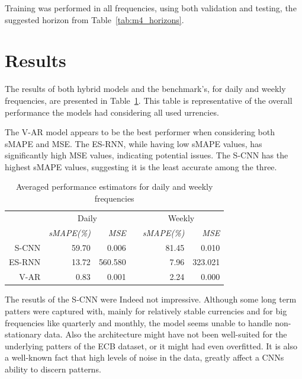 \documentclass[conference]{IEEEtran}
\begin{document}
Training was performed in all frequencies, using both validation and testing, the suggested horizon from Table~\ref{tab:m4_horizons}.

\section{Results}

The results of both hybrid models and the benchmark's, for daily and weekly frequencies, are presented in Table~\ref{tab:res}. This table is representative of the overall performance the models had considering all used  urrencies.

The V-AR model appears to be the best performer when considering both sMAPE and MSE. The ES-RNN, while having low sMAPE values, has significantly high MSE values, indicating potential issues. The S-CNN has the highest sMAPE values, suggesting it is the least accurate among the three.

\begin{table}\centering
{}
\caption{Averaged performance estimators for daily and weekly frequencies}\label{tab:res}
\begin{tabular}{@{}rrrcrr@{}}\toprule
& \multicolumn{2}{c}{Daily} & \phantom{abc}& \multicolumn{2}{c}{Weekly}\\
\cmidrule{2-3} \cmidrule{4-6}
& \textit{sMAPE(\%)} & \textit{MSE} && \textit{sMAPE(\%)} & \textit{MSE} \\
\midrule
S-CNN & 59.70  & 0.006 && 81.45 & 0.010 \\
ES-RNN & 13.72 & 560.580 && 7.96 & 323.021\\
V-AR & 0.83 & 0.001 && 2.24 & 0.000\\
\bottomrule
\end{tabular}
\end{table}

The resutls of the S-CNN were Indeed not impressive. Although some long term patters were captured with, mainly for relatively stable currencies and for big frequencies like quarterly and monthly, the model seems unable to handle non-stationary data. Also the architecture might have not been well-suited for the underlying patters of the ECB dataset, or it might had even overfitted. It is also a well-known fact that high levels of noise in the data, greatly affect a CNNs ability to discern patterns.
\end{document}
